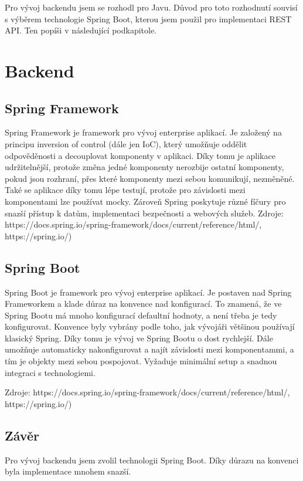 Pro vývoj backendu jsem se rozhodl pro Javu. Důvod pro toto rozhodnutí souvisí s výběrem technologie Spring Boot, kterou jsem použil pro implementaci REST API. Ten popíši v následující podkapitole.

\section{Backend}

\subsection{Spring Framework}
Spring Framework je framework pro vývoj enterprise aplikací. Je založený na principu inversion of control (dále jen IoC), který umožňuje oddělit odpověděnosti a decouplovat komponenty v aplikaci. Díky tomu je aplikace udržitelnější, protože změna jedné komponenty nerozbije ostatní komponenty, pokud jsou rozhraní, přes které komponenty mezi sebou komunikují, nezměněné. Také se aplikace díky tomu lépe testují, protože pro závislosti mezi komponentami lze používat mocky. Zároveň Spring poskytuje různé fíčury pro snazší přístup k datům, implementaci bezpečnosti a webových služeb. Zdroje: https://docs.spring.io/spring-framework/docs/current/reference/html/, https://spring.io/)

\subsection{Spring Boot}
Spring Boot je framework pro vývoj enterprise aplikací. Je postaven nad Spring Frameworkem a klade důraz na konvence nad konfigurací. To znamená, že ve Spring Bootu má mnoho konfigurací defaultní hodnoty, a není třeba je tedy konfigurovat. Konvence byly vybrány podle toho, jak vývojáři většinou používají klasický Spring. Díky tomu je vývoj ve Spring Bootu o dost rychlejší. Dále umožňuje automaticky nakonfigurovat a najít závislosti mezi komponentammi, a tím je objekty mezi sebou pospojovat. Vyžaduje minimální setup a snadnou integraci s technologiemi. 

Zdroje: https://docs.spring.io/spring-framework/docs/current/reference/html/, https://spring.io/)

\subsection{Závěr}

Pro vývoj backendu jsem zvolil technologii Spring Boot. Díky důrazu na konvenci byla implementace mnohem snazší.

